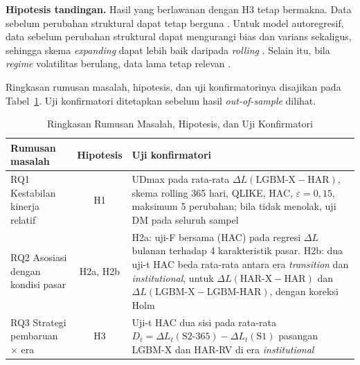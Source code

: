 \textbf{Hipotesis tandingan.} Hasil yang berlawanan dengan H3 tetap bermakna.
Data sebelum perubahan struktural dapat tetap berguna \cite{pesaran2007}.
Untuk model autoregresif, data sebelum perubahan struktural dapat mengurangi
bias dan varians sekaligus, sehingga skema \textit{expanding} dapat lebih baik
daripada \textit{rolling} \cite{rossi2013}. Selain itu, bila \textit{regime}
volatilitas berulang, data lama tetap relevan \cite{gama2014,suarez2023}.

Ringkasan rumusan masalah, hipotesis, dan uji konfirmatorinya disajikan pada
Tabel~\ref{tab:ringkasan}. Uji konfirmatori ditetapkan sebelum hasil
\textit{out-of-sample} dilihat.

\begin{table}[htbp]
  \caption{Ringkasan Rumusan Masalah, Hipotesis, dan Uji Konfirmatori}
  \label{tab:ringkasan}
  \centering
  \begingroup
  \small
  \begin{tabular}{|p{}|c|p{}|}
    \hline
    \textbf{Rumusan masalah} & \textbf{Hipotesis} &
    \textbf{Uji konfirmatori} \\
    \hline
    RQ1 Kestabilan kinerja relatif & H1 &
    UDmax pada rata-rata $\Delta L(\text{LGBM-X} - \text{HAR})$, skema rolling
    365 hari, QLIKE, HAC, $\varepsilon = 0{,}15$, maksimum 5 perubahan; bila
    tidak menolak, uji DM pada seluruh sampel \\
    \hline
    RQ2 Asosiasi dengan kondisi pasar & H2a, H2b &
    H2a: uji-F bersama (HAC) pada regresi $\Delta L$ bulanan terhadap
    4 karakteristik pasar. H2b: dua uji-t HAC beda rata-rata antara era
    \textit{transition} dan \textit{institutional}, untuk
    $\Delta L(\text{HAR-X} - \text{HAR})$ dan
    $\Delta L(\text{LGBM-X} - \text{LGBM-HAR})$, dengan koreksi Holm \\
    \hline
    RQ3 Strategi pembaruan $\times$ era & H3 &
    Uji-t HAC dua sisi pada rata-rata
    $D_t = \Delta L_t(\text{S2-365}) - \Delta L_t(\text{S1})$ pasangan LGBM-X
    dan HAR-RV di era \textit{institutional} \\
    \hline
  \end{tabular}
  \endgroup
\end{table}
